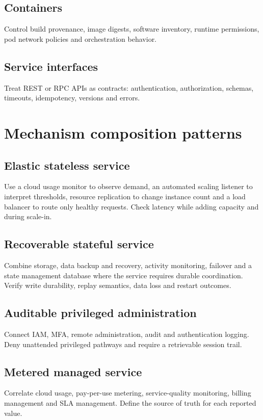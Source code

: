 \documentclass[10pt,letterpaper]{article}
\begin{document}
\subsection{Containers}
Control build provenance, image digests, software inventory, runtime permissions, pod network policies and orchestration behavior.
\subsection{Service interfaces}
Treat REST or RPC APIs as contracts: authentication, authorization, schemas, timeouts, idempotency, versions and errors.
\section{Mechanism composition patterns}
\subsection{Elastic stateless service}
Use a cloud usage monitor to observe demand, an automated scaling listener to interpret thresholds, resource replication to change instance count and a load balancer to route only healthy requests. Check latency while adding capacity and during scale-in.
\subsection{Recoverable stateful service}
Combine storage, data backup and recovery, activity monitoring, failover and a state management database where the service requires durable coordination. Verify write durability, replay semantics, data loss and restart outcomes.
\subsection{Auditable privileged administration}
Connect IAM, MFA, remote administration, audit and authentication logging. Deny unattended privileged pathways and require a retrievable session trail.
\subsection{Metered managed service}
Correlate cloud usage, pay-per-use metering, service-quality monitoring, billing management and SLA management. Define the source of truth for each reported value.
\end{document}
